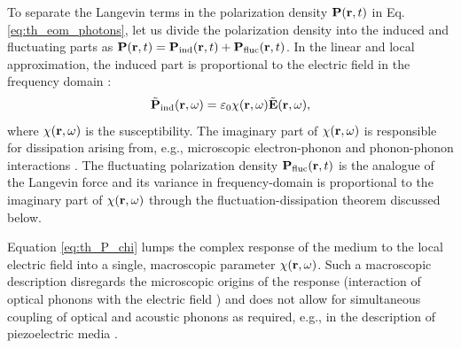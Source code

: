 
To separate the Langevin terms in the polarization density $\mathbf{P}(\mathbf{r},t)$ in Eq. \eqref{eq:th_eom_photons}, let us divide the polarization density into the induced and fluctuating parts as $\mathbf{P}(\mathbf{r},t)=\mathbf{P}_{\textrm{ind}}(\mathbf{r},t)+ \mathbf{P}_{\textrm{fluc}}(\mathbf{r},t)$. In the linear and local approximation, the induced part is proportional to the electric field in the frequency domain \cite{novotny}:
\begin{equation}
 \tilde{\mathbf{P}}_{\textrm{ind}}(\mathbf{r},\omega)= \varepsilon_0 \chi(\mathbf{r},\omega) \tilde{\mathbf{E}}(\mathbf{r},\omega), \label{eq:th_P_chi}
\end{equation}
where $\chi(\mathbf{r},\omega)$ is the susceptibility. The imaginary part of $\chi(\mathbf{r},\omega)$ is responsible for dissipation arising from, e.g., microscopic electron-phonon and phonon-phonon interactions \cite{}. The fluctuating polarization density $\mathbf{P}_{\textrm{fluc}}(\mathbf{r},t)$ is the analogue of the Langevin force and its variance in frequency-domain is proportional to the imaginary part of $\chi(\mathbf{r},\omega)$ through the fluctuation-dissipation theorem discussed below.

Equation \eqref{eq:th_P_chi} lumps the complex response of the medium to the local electric field into a single, macroscopic parameter $\chi(\mathbf{r},\omega)$. Such a macroscopic description disregards the microscopic origins of the response (interaction of optical phonons with the electric field \cite{bornhuang}) and does not allow for simultaneous coupling of optical and acoustic phonons as required, e.g., in the description of piezoelectric media \cite{}. 

